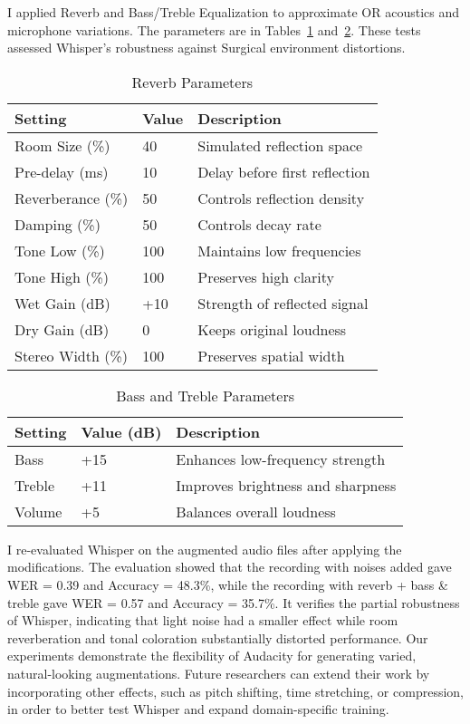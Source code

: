 \documentclass[11pt,a4paper]{article}
\begin{document}
I applied Reverb and Bass/Treble Equalization to approximate OR acoustics and microphone variations. The parameters are in Tables~\ref{tab:reverb_params} and~\ref{tab:eq_params}. These tests assessed Whisper's robustness against Surgical environment distortions.
\begin{table}[h]
\centering
\caption{Reverb Parameters}
\label{tab:reverb_params}
{\small
\begin{tabular}{lll}
\hline
\textbf{Setting} & \textbf{Value} & \textbf{Description} \\
\hline
Room Size (\%) & 40 & Simulated reflection space \\
Pre-delay (ms) & 10 & Delay before first reflection \\
Reverberance (\%) & 50 & Controls reflection density \\
Damping (\%) & 50 & Controls decay rate \\
Tone Low (\%) & 100 & Maintains low frequencies \\
Tone High (\%) & 100 & Preserves high clarity \\
Wet Gain (dB) & +10 & Strength of reflected signal \\
Dry Gain (dB) & 0 & Keeps original loudness \\
Stereo Width (\%) & 100 & Preserves spatial width \\
\hline
\end{tabular}
}
\end{table}

\begin{table}[h]
\centering
\caption{Bass and Treble Parameters}
\label{tab:eq_params}
{\small
\begin{tabular}{lll}
\hline
\textbf{Setting} & \textbf{Value (dB)} & \textbf{Description} \\
\hline
Bass & +15 & Enhances low-frequency strength \\
Treble & +11 & Improves brightness and sharpness \\
Volume & +5 & Balances overall loudness \\
\hline
\end{tabular}
}
\end{table}

I re-evaluated Whisper on the augmented audio files after applying the modifications. The evaluation showed that the recording with noises added gave WER = 0.39 and Accuracy = 48.3\%, while the recording with reverb + bass \& treble gave WER = 0.57 and Accuracy = 35.7\%. It verifies the partial robustness of Whisper, indicating that light noise had a smaller effect while room reverberation and tonal coloration substantially distorted performance. Our experiments demonstrate the flexibility of Audacity for generating varied, natural-looking augmentations. Future researchers can extend their work by incorporating other effects, such as pitch shifting, time stretching, or compression, in order to better test Whisper and expand domain-specific training.
\end{document}
